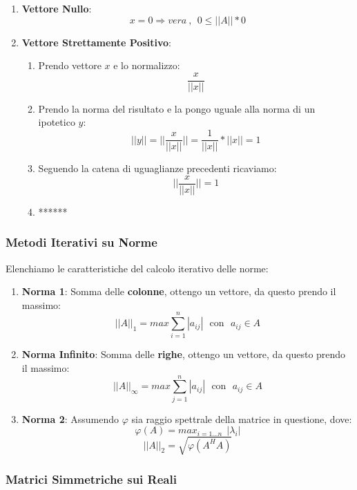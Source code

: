 \documentclass{article}
\begin{document}
\begin{enumerate}
    \item \textbf{Vettore Nullo}:
    \[ x=0 \Rightarrow vera \: , \: \: 0 \leq ||A|| * 0 \]
    \item \textbf{Vettore Strettamente Positivo}:
    \begin{enumerate}
        \item Prendo vettore $x$ e lo normalizzo:
        \[ \frac{x}{||x||} \]
        \item Prendo la norma del risultato e la pongo uguale alla norma di un ipotetico $y$:
        \[ ||y|| = ||\frac{x}{||x||}|| = \frac{1}{||x||} * ||x|| = 1 \]
        \item Seguendo la catena di uguaglianze precedenti ricaviamo:
        \[ ||\frac{x}{||x||}|| = 1 \]
        \item ******
    \end{enumerate}
\end{enumerate}

\subsubsection{Metodi Iterativi su Norme}

Elenchiamo le caratteristiche del calcolo iterativo delle norme:

\begin{enumerate}
    \item \textbf{Norma 1}: Somma delle \textbf{colonne}, ottengo un vettore, da questo prendo il massimo:
    \[ \boxed{||A||_{1} = max\sum^{n}_{i=1}|a_{ij}| \: \: \: \text{con} \: \: \: a_{ij} \in A}\]
    \item \textbf{Norma Infinito}: Somma delle \textbf{righe}, ottengo un vettore, da questo prendo il massimo:
    \[ \boxed{||A||_{\infty} = max\sum^{n}_{j=1}|a_{ij}| \: \: \: \text{con} \: \: \: a_{ij} \in A}\]
    \item \textbf{Norma 2}: Assumendo $\varphi$ sia raggio spettrale della matrice in questione, dove: \[\varphi(A) = max_{i=1...n} \: \:|\lambda_{i}|\]
    \vspace*{3px}
    \[ \boxed{||A||_{2} = \sqrt{\varphi(A^{H}A)}} \]
\end{enumerate}

\newpage

\subsubsection{Matrici Simmetriche sui Reali}
\end{document}

